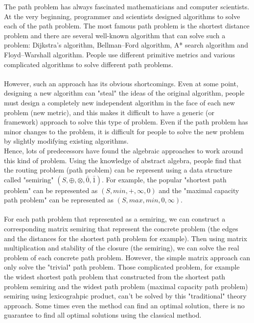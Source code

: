 \documentclass[a4paper,12pt,twoside,openright]{report}
\begin{document}
The path problem has always fascinated mathematicians and computer scientists. 
At the very beginning, programmer and scientists designed algorithms to solve each of the path problem. 
The most famous path problem is the shortest distance problem and there are several well-known algorithm that can solve such a problem: Dijkstra's algorithm, Bellman–Ford algorithm, A* search algorithm and Floyd–Warshall algorithm. People use different primitive metrics and various complicated algorithms to solve different path problems.\\\\
However, such an approach has its obvious shortcomings. Even at some point, designing a new algorithm can "steal" the ideas of the original algorithm, people must design a completely new independent algorithm in the face of each new problem (new metric), and this makes it difficult to have a generic (or framework) approach to solve this type of problem.  Even if the path problem has minor changes to the problem, it is difficult for people to solve the new problem by slightly modifying existing algorithms. \\
Hence, lots of predecessors have found the algebraic approaches to work around this kind of problem. 
Using the knowledge of abstract algebra, people find that the routing problem (path problem) can be represent using a data structure called "semiring" $(S,\oplus,\otimes,\bar{0},\bar{1})$\cite{carre_algebra_1971,WONGSEELASHOTE197955,dynerowicz_forwarding_2013,mohri_semiring_2002,gurney_lexicographic_2007}. For example, the popular "shortest path problem" can be represented as $(S, min,+,\infty,0)$\cite{mohri_semiring_2002} and the "maximal capacity path problem" can be represented as $(S, max,min, 0, \infty)$. \\\\
For each path problem that represented as a semiring, we can construct a corresponding matrix semiring that represent the concrete problem (the edges and the distances for the shortest path problem for example). Then using matrix multiplication and stability of the closure (the semiring), we can solve the real problem of each concrete path problem. However, the simple matrix approach can only solve the "trivial" path problem. Those complicated problem, for example the widest shortest path problem that constructed from the shortest path problem semiring and the widest path problem (maximal capacity path problem) semiring using lexicograhpic product, can't be solved by this "traditional" theory approach. Some times even the method can find an optimal solution, there is no guarantee to find all optimal solutions using the classical method.\\\\
\end{document}
